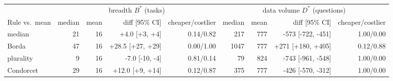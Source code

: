 \begin{tabular}{@{}lrrrrrrrr@{}}\toprule
 & \multicolumn{4}{c}{breadth $B^\ast$ (tasks)} & \multicolumn{4}{c}{data volume $D^\ast$ (questions)}\\
\cmidrule(lr){2-5}\cmidrule(lr){6-9}
Rule vs.\ mean & median & mean & diff [95\% CI] & cheaper/costlier & median & mean & diff [95\% CI] & cheaper/costlier\\\midrule
median & 21 & 16 & +4.0 [+3, +4] & 0.14/0.82 & 217 & 777 & -573 [-722, -451] & 1.00/0.00\\
Borda & 47 & 16 & +28.5 [+27, +29] & 0.00/1.00 & 1047 & 777 & +271 [+180, +405] & 0.12/0.88\\
plurality & 9 & 16 & -7.0 [-10, -4] & 0.81/0.14 & 79 & 824 & -743 [-961, -548] & 1.00/0.00\\
Condorcet & 29 & 16 & +12.0 [+9, +14] & 0.12/0.87 & 375 & 777 & -426 [-570, -312] & 1.00/0.00\\
\bottomrule\end{tabular}
